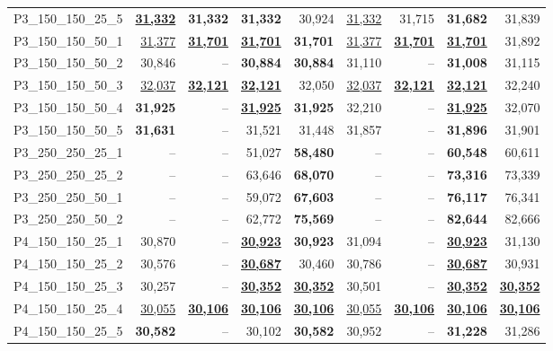 \documentclass[ppgc,prop-tese,english,formais,babel]{iiufrgs}
\begin{document}
\begin{table}
\begin{tabular}{lrrrrrrrr}
P3\_150\_150\_25\_5 & \underline{\textbf{31,332}} & \textbf{31,332} & \textbf{31,332} & 30,924 & \underline{31,332} & 31,715 & \textbf{31,682} & 31,839 \\
P3\_150\_150\_50\_1 & \underline{31,377} & \underline{\textbf{31,701}} & \underline{\textbf{31,701}} & \textbf{31,701} & \underline{31,377} & \underline{\textbf{31,701}} & \underline{\textbf{31,701}} & 31,892 \\
P3\_150\_150\_50\_2 & 30,846 & -- & \textbf{30,884} & \textbf{30,884} & 31,110 & -- & \textbf{31,008} & 31,115 \\
P3\_150\_150\_50\_3 & \underline{32,037} & \underline{\textbf{32,121}} & \underline{\textbf{32,121}} & 32,050 & \underline{32,037} & \underline{\textbf{32,121}} & \underline{\textbf{32,121}} & 32,240 \\
P3\_150\_150\_50\_4 & \textbf{31,925} & -- & \underline{\textbf{31,925}} & \textbf{31,925} & 32,210 & -- & \underline{\textbf{31,925}} & 32,070 \\
P3\_150\_150\_50\_5 & \textbf{31,631} & -- & 31,521 & 31,448 & 31,857 & -- & \textbf{31,896} & 31,901 \\
P3\_250\_250\_25\_1 & -- & -- & 51,027 & \textbf{58,480} & -- & -- & \textbf{60,548} & 60,611 \\
P3\_250\_250\_25\_2 & -- & -- & 63,646 & \textbf{68,070} & -- & -- & \textbf{73,316} & 73,339 \\
P3\_250\_250\_50\_1 & -- & -- & 59,072 & \textbf{67,603} & -- & -- & \textbf{76,117} & 76,341 \\
P3\_250\_250\_50\_2 & -- & -- & 62,772 & \textbf{75,569} & -- & -- & \textbf{82,644} & 82,666 \\
P4\_150\_150\_25\_1 & 30,870 & -- & \underline{\textbf{30,923}} & \textbf{30,923} & 31,094 & -- & \underline{\textbf{30,923}} & 31,130 \\
P4\_150\_150\_25\_2 & 30,576 & -- & \underline{\textbf{30,687}} & 30,460 & 30,786 & -- & \underline{\textbf{30,687}} & 30,931 \\
P4\_150\_150\_25\_3 & 30,257 & -- & \underline{\textbf{30,352}} & \underline{\textbf{30,352}} & 30,501 & -- & \underline{\textbf{30,352}} & \underline{\textbf{30,352}} \\
P4\_150\_150\_25\_4 & \underline{30,055} & \underline{\textbf{30,106}} & \underline{\textbf{30,106}} & \underline{\textbf{30,106}} & \underline{30,055} & \underline{\textbf{30,106}} & \underline{\textbf{30,106}} & \underline{\textbf{30,106}} \\
P4\_150\_150\_25\_5 & \textbf{30,582} & -- & 30,102 & \textbf{30,582} & 30,952 & -- & \textbf{31,228} & 31,286 \\

\end{tabular}
\end{table}
\end{document}

